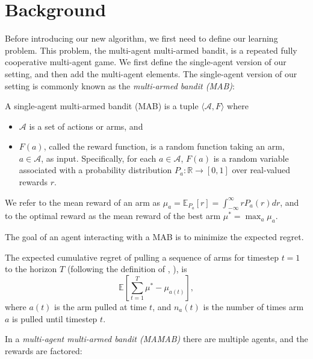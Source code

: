 \documentclass{article}
\begin{document}
\section{Background}\label{sec:bg}
Before introducing our new algorithm, we first need to define our learning problem. This problem, the multi-agent multi-armed bandit, is a repeated fully cooperative multi-agent game. We first define the single-agent version of our setting, and then add the multi-agent elements. The single-agent version of our setting is commonly known as the \emph{multi-armed bandit (MAB)}:
\begin{definition}
A single-agent multi-armed bandit (MAB) \cite{thompson1933likelihood} is a tuple $\langle \mathcal{A},F\rangle$ where
\begin{itemize} 
\item $\mathcal{A}$ is a set of actions or arms, and 
\item $F(a)$, called the reward function, is a random function taking an arm,  $a \in \mathcal{A}$, as input. Specifically, for each $a \in \mathcal{A}$, $F(a)$ is a random variable associated with a probability distribution $P_a : \mathbb{R} \rightarrow [0,1] $ over real-valued rewards $r$.
\end{itemize}
We refer to the mean reward of an arm as $\mu_a = \mathbb{E}_{P_a}[r] = \int_{-\infty}^{\infty} r P_a(r) dr$, and to the optimal reward as {the mean reward of the best arm} $\mu^* = \max_a \mu_a$. %
\end{definition}
The goal of an agent interacting with a MAB is to minimize the expected regret. 
\begin{definition}
The {expected} cumulative regret of pulling a sequence of arms for timestep $t=1$  to the {horizon} $T$ (following the definition of \citeauthor{agrawal2012analysis}, \citeyear{agrawal2012analysis}), is
\[
\mathbb{E}\left[ \sum_{t=1}^{T} \mu^* - \mu_{a(t)}\right], %
\]
where $a(t)$ is the arm pulled at time $t$, and $n_a(t)$ is the number of times arm $a$ is pulled until timestep $t$. 
\end{definition} 
In a \emph{multi-agent multi-armed bandit (MAMAB)} there are multiple agents, and the rewards are factored: 
\end{document}
